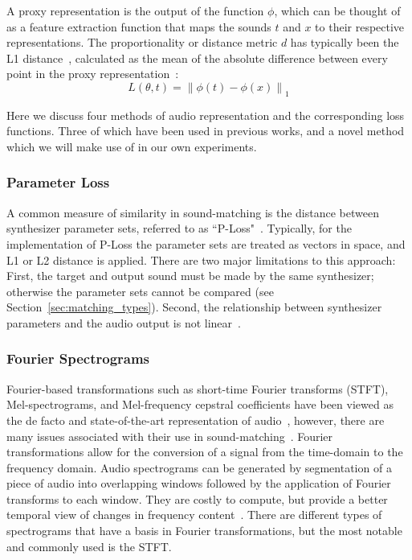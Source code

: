 \documentclass[lettersize,journal]{IEEEtran}
\providecommand{\gls}[1]{#1}
\begin{document}
\noindent

A proxy representation is the output of the function \( \phi \), which can be thought of as a feature extraction function that maps the sounds \( t \) and \( x \) to their respective representations. 
The proportionality or distance metric $d$ has typically been the L1 distance~\cite{turian2020sorry,richard2025model}, calculated as the mean of the absolute difference between every point in the proxy representation~\cite{engel2020ddsp,vahidi2023mesostructures}:
\[
L(\theta, t) = \left\| \phi(t) - \phi(x) \right\|_1
\]

Here we discuss four methods of audio representation and the corresponding loss functions. Three of which have been used in previous works, and a novel method which we will make use of in our own experiments. 

\subsubsection{Parameter Loss}
A common measure of similarity in sound-matching is the distance between synthesizer parameter sets, referred to as ``P-Loss"~\cite{han2023perceptual}. Typically, for the implementation of P-Loss the parameter sets are treated as vectors in space, and L1 or L2 distance is applied. There are two major limitations to this approach: First, the target and output sound must be made by the same synthesizer; otherwise the parameter sets cannot be compared (see Section~\ref{sec:matching_types}). Second, the relationship between synthesizer parameters and the audio output is not linear~\cite{shier2020spiegelib,han2023perceptual,esling2019flow}. 

\subsubsection{Fourier Spectrograms}
\label{sec:fourier_specs}
Fourier-based transformations such as short-time Fourier transforms (\gls{STFT}), Mel-spectrograms, and Mel-frequency cepstral coefficients have been viewed as the de facto and state-of-the-art representation of audio~\cite{beauchamp2003error,mitchell2007evolutionary,yee2018automatic}, however, there are many issues associated with their use in sound-matching~\cite{turian2020sorry,vahidi2023mesostructures,han2023perceptual,uzrad2024diffmoog}. Fourier transformations allow for the conversion of a signal from the time-domain to the frequency domain. Audio spectrograms can be generated by segmentation of a piece of audio into overlapping windows followed by the application of Fourier transforms to each window. They are costly to compute, but provide a better temporal view of changes in frequency content~\cite{muller2007dynamic,smith2007mathematics}. There are different types of spectrograms that have a basis in Fourier transformations, but the most notable and commonly used is the STFT.  
\end{document}
